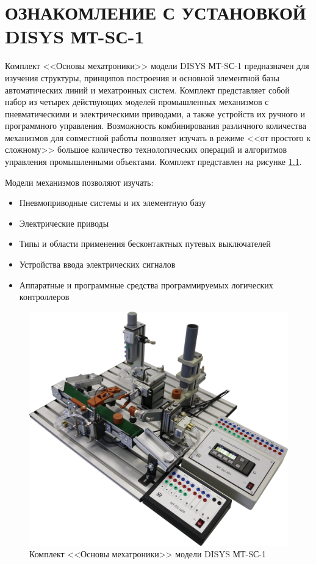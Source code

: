 \chapter{ОЗНАКОМЛЕНИЕ С УСТАНОВКОЙ DISYS МТ-SС-1}
Комплект <<Основы мехатроники>> модели DISYS МТ-SС-1 предназначен для изучения структуры, принципов построения и основной элементной базы автоматических линий и мехатронных систем.
Комплект представляет собой набор из четырех действующих моделей промышленных механизмов с пневматическими и электрическими приводами, а также устройств их ручного и программного управления.
Возможность комбинирования различного количества механизмов для совместной работы позволяет изучать в режиме <<от простого к сложному>> большое количество технологических операций и алгоритмов управления промышленными объектами. Комплект представлен на рисунке \ref{fig:all}.

Модели механизмов позволяют изучать:
\begin{itemize}
    \item Пневмоприводные системы и их элементную базу
    \item Электрические приводы
    \item Типы и области применения бесконтактных путевых выключателей
    \item Устройства ввода электрических сигналов
    \item Аппаратные и программные средства программируемых логических контроллеров
\end{itemize}


\begin{figure}[hb]
    \centering
    \includegraphics[scale=0.30]{fig/3.1.png}
    \caption{Комплект <<Основы мехатроники>> модели DISYS МТ-SС-1}
    \label{fig:all}
\end{figure}

